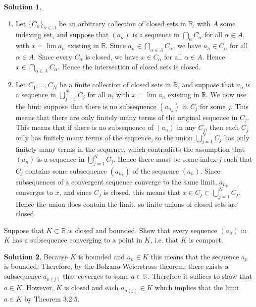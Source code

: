 \documentclass[12pt]{article}
\theoremstyle{definition}
\theoremstyle{definition}
\newtheorem*{soln}{Solution}
\newcommand{\R}{\mathbb{R}}
\begin{document}
\begin{soln}
\begin{enumerate}[label=(\alph*)]
\item Let $\{C_\alpha\}_{\alpha\in A}$ be an arbitrary collection of closed sets in $\R$, with $A$ some indexing set, and suppose that $(a_n)$ is a sequence in $\bigcap_\alpha C_\alpha$ for all $\alpha\in A$, with $x=\lim a_n$ existing in $\R$. Since $a_n\in \bigcap_{\alpha\in A} C_\alpha$, we have $a_n\in C_\alpha$ for all $\alpha\in A$. Since every $C_\alpha$ is closed, we have $x\in C_\alpha$ for all $\alpha\in A$. Hence $x\in \bigcap_{\alpha\in A} C_\alpha$. Hence the intersection of closed sets is closed.

\item Let $C_1,\dots,C_N$ be a finite collection of closed sets in $\R$, and suppose that $a_n$ is a sequence in $\bigcup_{j=1}^N C_j$ for all $n$, with $x=\lim a_n$ existing in $\R$. We now use the hint: suppose that there is no subsequence $(a_{n_k})$ in $C_j$ for some $j$. This means that there are only finitely many terms of the original sequence in $C_j$. This means that if there is no subsequence of $(a_n)$ in any $C_j$, then each $C_j$ only has finitely many terms of the sequence, so the union $\bigcup_{j=1}^N C_j$ has only finitely many terms in the sequence, which contradicts the assumption that $(a_n)$ is a sequence in $\bigcup_{j=1}^N C_j$. Hence there must be some index $j$ such that $C_j$ contains some subsequence $(a_{n_k})$ of the sequence $(a_n)$. Since subsequences of a convergent sequence converge to the same limit, $a_{n_k}$ converges to $x$, and since $C_j$ is closed, this means that $x\in C_j\subset \bigcup_{j=1}^N C_j$. Hence the union does contain the limit, so finite unions of closed sets are closed.
\end{enumerate}
\end{soln}

\break

\begin{prob}
 Suppose that $K \subset \R$ is closed and bounded. Show that every sequence $(a_n)$ in $K$ has a subsequence converging to a point in $K$, i.e. that $K$ is compact.
\end{prob}

\begin{soln}
Because $K$ is bounded and $a_n \in K$ this means that the sequence $a_n$ is bounded. Therefore, by the Bolzano-Weierstrass theorem, there exists a subsequence $a_{n(j)}$ that coverges to some $a \in \mathbb{R}$. Therefore it suffices to show that $a \in K$. However, $K$ is closed and each $a_{n(j)} \in K$ which implies that the limit $a \in K$ by Theorem 3.2.5. 
\end{soln}
\end{document}
